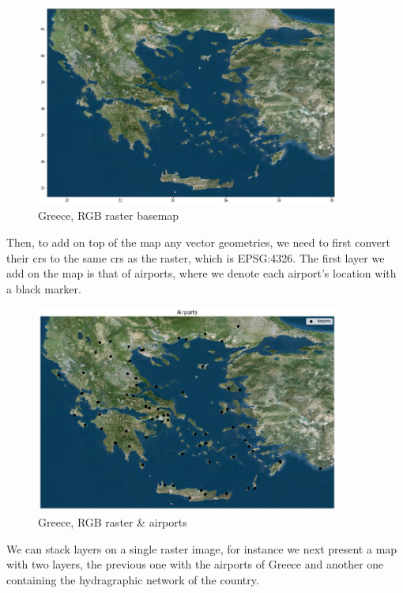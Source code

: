 \begin{figure}[h]
    \centering
    \includegraphics[width=10cm]{figures/q3_1_Greece_RGB_map.png}
    \caption{Greece, RGB raster basemap}
    \label{fig:Greece, RGB raster basemap}
\end{figure}
\FloatBarrier %

Then, to add on top of the map any vector geometries, we need to first convert their crs to the same crs as the raster, which is EPSG:4326. The first layer we add on the map is that of airports, where we denote each airport's location with a black marker.

\begin{figure}[h]
    \centering
    \includegraphics[width=10cm]{figures/q3_1_Greece_RGB_map_airports.png}
    \caption{Greece, RGB raster & airports}
    \label{fig:Greece, RGB raster & airports}
\end{figure}
\FloatBarrier %

We can stack layers on a single raster image, for instance we next present a map with two layers, the previous one with the airports of Greece and another one containing the hydragraphic network of the country.

